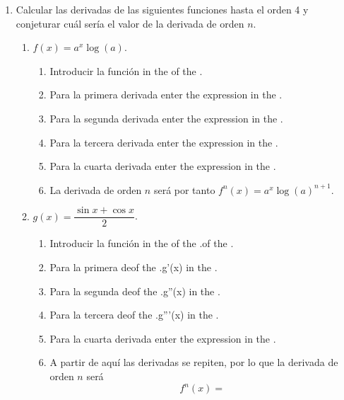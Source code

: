 \begin{enumerate}[leftmargin=*]
\item  Calcular las derivadas de las siguientes funciones hasta el orden 4 y conjeturar cuál sería el valor de la derivada de orden $n$.
      \begin{enumerate}
      \item  $f(x)=a^x\log(a)$.
            \begin{indication}
            \begin{enumerate}
            \item Introducir la función  in the  of the .
            \item Para la primera derivada enter the expression  in the .
            \item Para la segunda derivada enter the expression  in the .
            \item Para la tercera derivada enter the expression  in the .
            \item Para la cuarta derivada enter the expression  in the .
            \item La derivada de orden $n$ será por tanto $f^n(x)=a^x\log(a)^{n+1}$.
            \end{enumerate}
            \end{indication}
      \item  $g(x)=\dfrac{\sin x +\cos x}{2}$.
            \begin{indication}
            \begin{enumerate}
            \item Introducir la función  in the  of the .of the .
            \item Para la primera deof the .{g'(x)} in the .
            \item Para la segunda deof the .{g''(x)} in the .
            \item Para la tercera deof the .{g'''(x)} in the .
            \item Para la cuarta derivada enter the expression  in the .
            \item A partir de aquí las derivadas se repiten, por lo que la derivada de orden $n$ será
                  \[
                  f^n(x)=
\]
\end{enumerate}
\end{indication}
\end{enumerate}
\end{enumerate}
